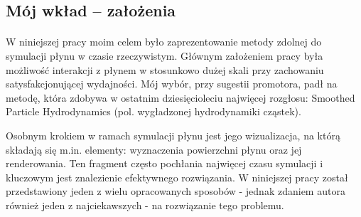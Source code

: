 \subsection{Mój wkład -- założenia}
\paragraph{}
W niniejszej pracy moim celem było zaprezentowanie metody zdolnej do symulacji płynu w czasie rzeczywistym. Głównym założeniem pracy była możliwość interakcji z płynem w stosunkowo dużej skali przy zachowaniu satysfakcjonującej wydajności. Mój wybór, przy sugestii promotora, padł na metodę, która zdobywa w ostatnim dziesięcioleciu najwięcej rozgłosu: Smoothed Particle Hydrodynamics (pol. wygładzonej hydrodynamiki cząstek).
\par
Osobnym krokiem w ramach symulacji płynu jest jego wizualizacja, na którą składają się m.in. elementy: wyznaczenia powierzchni płynu oraz jej renderowania. Ten fragment często pochłania najwięcej czasu symulacji i kluczowym jest znalezienie efektywnego rozwiązania. W niniejszej pracy został przedstawiony jeden z wielu opracowanych sposobów - jednak zdaniem autora również jeden z najciekawszych - na rozwiązanie tego problemu.
\par

